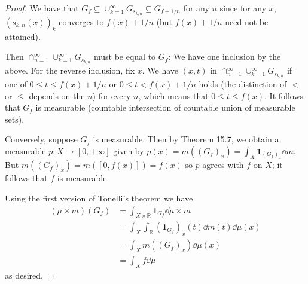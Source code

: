 \documentclass[11pt]{article}
\begin{document}
\begin{enumerate}
\begin{proof}
      We have that $G_f\subseteq \cup_{k=1}^\infty G_{s_{k,n}}\subseteq G_{f+1/n}$ for any $n$ since for any $x$, $(s_{k,n}(x))_k$ converges to $f(x)+1/n$ (but $f(x)+1/n$ need not be attained).

      Then $\cap_{n=1}^\infty\cup_{k=1}^\infty G_{s_{k,n}}$ must be equal to $G_f$: We have one inclusion by the above. For the reverse inclusion, fix $x$. We have $(x,t)$ in $\cap_{n=1}^\infty\cup_{k=1}^\infty G_{s_{k,n}}$ if one of $0\leq t \leq f(x)+1/n$ or $0\leq t < f(x)+1/n$ holds (the distinction of $<$ or $\leq$ depends on the $n$) for every $n$, which means that $0\leq t\leq f(x)$. It follows that $G_f$ is measurable (countable intersection of countable union of measurable sets).

      Conversely, suppose $G_f$ is measurable. Then by Theorem 15.7, we obtain a measurable $p\colon X\to [0,+\infty]$ given by $p(x) = m((G_f)_x) = \int_X \mathbf{1}_{(G_f)_x}\dd m$. But $m((G_f)_x) = m([0,f(x)]) = f(x)$ so $p$ agrees with $f$ on $X$; it follows that $f$ is measurable.

      Using the first version of Tonelli's theorem we have \begin{align*}
        (\mu\times m)(G_f) &= \int_{X\times\mathbb{R}}\mathbf{1}_{G_f}\dd{\mu\times m}\\
        &= \int_X\int_\mathbb{R} (\mathbf{1}_{G_f})_x(t)\dd{m(t)}\dd{\mu(x)}\\
        &=\int_X m((G_f)_x)\dd{\mu(x)}\\
        &= \int_X f\dd \mu
      \end{align*} as desired.
    \end{proof}
\end{enumerate}
\end{document}
